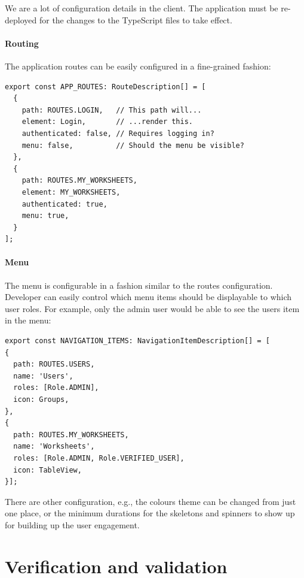 \documentclass[a4paper,twoside,12pt]{book}
\begin{document}
We are a lot of configuration details in the client. The application must be re-deployed for the changes to the TypeScript files to take effect.

\subsubsection{Routing}

The application routes can be easily configured in a fine-grained fashion:

\begin{verbatim}
export const APP_ROUTES: RouteDescription[] = [
  {
    path: ROUTES.LOGIN,   // This path will...
    element: Login,       // ...render this.
    authenticated: false, // Requires logging in?
    menu: false,          // Should the menu be visible?
  },
  {
    path: ROUTES.MY_WORKSHEETS,
    element: MY_WORKSHEETS,
    authenticated: true,
    menu: true,
  }
];
\end{verbatim}

\subsubsection{Menu}

The menu is configurable in a fashion similar to the routes configuration. Developer can easily control which menu items should be displayable to which user roles. For example, only the admin user would be able to see the users item in the menu:

\begin{verbatim}
export const NAVIGATION_ITEMS: NavigationItemDescription[] = [
{
  path: ROUTES.USERS,
  name: 'Users',
  roles: [Role.ADMIN],
  icon: Groups,
},
{
  path: ROUTES.MY_WORKSHEETS,
  name: 'Worksheets',
  roles: [Role.ADMIN, Role.VERIFIED_USER],
  icon: TableView,
}];
\end{verbatim}

There are other configuration, e.g., the colours theme can be changed from just one place, or the minimum durations for the skeletons and spinners to show up for building up the user engagement.



\chapter{Verification and validation}
\end{document}
